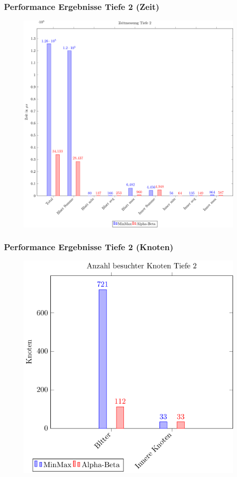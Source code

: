 \documentclass{beamer}
\begin{document}
\begin{frame}
\frametitle{Performance Ergebnisse Tiefe 2 (Zeit)}
  \begin{figure}
    \centering
    \includegraphics[scale=0.4]{figures/time-2.pdf}
  \end{figure}

\end{frame}


\begin{frame}
\frametitle{Performance Ergebnisse Tiefe 2 (Knoten)}
  \begin{figure}
    \centering
    \includegraphics[scale=0.8]{figures/node-2.pdf}
  \end{figure}

\end{frame}
\end{document}
